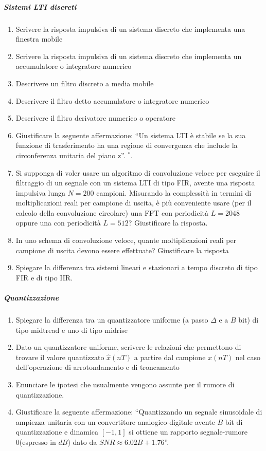 \documentclass[
]{article}
\providecommand{\tightlist}{%
  \setlength{\itemsep}{0pt}\setlength{\parskip}{0pt}}
\begin{document}
\subparagraph{Sistemi LTI discreti}\label{sistemi-lti-discreti}

\begin{enumerate}
\def\labelenumi{\arabic{enumi}.}
\setcounter{enumi}{29}
\tightlist
\item
  Scrivere la risposta impulsiva di un sistema discreto che implementa
  una finestra mobile
\item
  Scrivere la risposta impulsiva di un sistema discreto che implementa
  un accumulatore o integratore numerico
\item
  Descrivere un filtro discreto a media mobile
\item
  Descrivere il filtro detto accumulatore o integratore numerico
\item
  Descrivere il filtro derivatore numerico o operatore
\item
  Giustificare la seguente affermazione: ``Un sistema LTI è stabile se
  la sua funzione di trasferimento ha una regione di convergenza che
  include la circonferenza unitaria del piano z''. \(^*\).
\item
  Si supponga di voler usare un algoritmo di convoluzione veloce per
  eseguire il filtraggio di un segnale con un sistema LTI di tipo FIR,
  avente una risposta impulsiva lunga \(N = 200\) campioni. Misurando la
  complessità in termini di moltiplicazioni reali per campione di
  uscita, è più conveniente usare (per il calcolo della convoluzione
  circolare) una FFT con periodicità \(L = 2048\) oppure una con
  periodicità \(L = 512\)? Giustificare la risposta.
\item
  In uno schema di convoluzione veloce, quante moltiplicazioni reali per
  campione di uscita devono essere effettuate? Giustificare la risposta
\item
  Spiegare la differenza tra sistemi lineari e stazionari a tempo
  discreto di tipo FIR e di tipo IIR.
\end{enumerate}

\subparagraph{Quantizzazione}\label{quantizzazione}

\begin{enumerate}
\def\labelenumi{\arabic{enumi}.}
\setcounter{enumi}{38}
\tightlist
\item
  Spiegare la differenza tra un quantizzatore uniforme (a passo
  \(\Delta\) e a \(B\) bit) di tipo midtread e uno di tipo midrise
\item
  Dato un quantizzatore uniforme, scrivere le relazioni che permettono
  di trovare il valore quantizzato \(\hat{x}(nT)\) a partire dal
  campione \(x(nT)\) nel caso dell'operazione di arrotondamento e di
  troncamento
\item
  Enunciare le ipotesi che usualmente vengono assunte per il rumore di
  quantizzazione.
\item
  Giustificare la seguente affermazione: ``Quantizzando un segnale
  sinusoidale di ampiezza unitaria con un convertitore
  analogico-digitale avente \(B\) bit di quantizzazione e dinamica
  \([-1, 1]\) si ottiene un rapporto segnale-rumore 0(espresso in
  \(dB\)) dato da \(SNR \approx 6.02B + 1.76\)''.
\end{enumerate}
\end{document}
